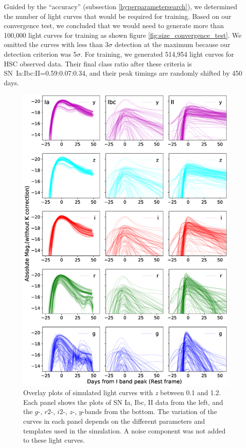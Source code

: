 \documentclass[useamsfonts]{pasj01}
\begin{document}
Guided by the ``accuracy'' (subsection \ref{hyperparametersearch}), we determined the number of light curves that would be required for training.   
Based on our convergence test, we concluded that we would need to generate more than 100,000 light curves for training as shown figure \ref{fig:size_convergence_test}.
We omitted the curves with less than 3$\sigma$ detection at the maximum because our detection criterion was 5$\sigma$. %
For training, we generated 514,954 light curves for HSC observed data. 
Their final class ratio after these criteria is SN~Ia:Ibc:II=0.59:0.07:0.34, and their peak timings are randomly shifted by 450 days.
%
%
\begin{figure}[htbp]
  \begin{center}
     \includegraphics[width=130mm]{figures/SimLCsamples.eps}
  \end{center}
  \vspace{-6mm}
  \caption{%
  Overlay plots of simulated light curves with {\it z} between 0.1 and 1.2.
  Each panel shows the plots of SN Ia, Ibc, II data from the left, and the $g$-, $r2$-, $i2$-, $z$-, $y$-bands from the bottom.
  The variation of the curves in each panel depends on the different parameters and templates used in the simulation.
  A noise component was not added to these light curves.
  }%
  \label{fig:simLCsamples}
\end{figure}
\end{document}
